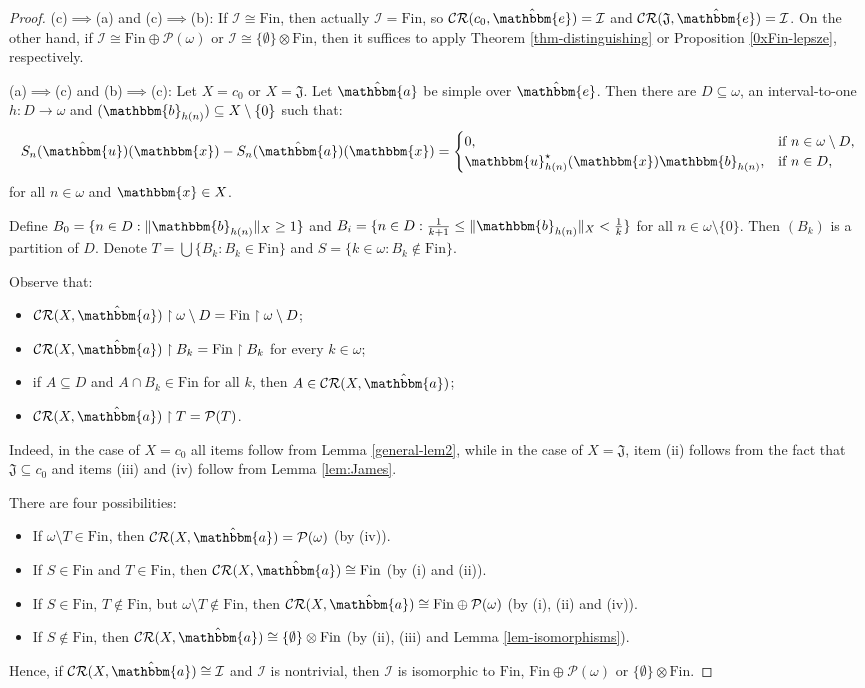 \documentclass{amsart}
\newcommand{\I}{\mathcal{I}}
\newcommand{\Fin}{\mathrm{Fin}}
\newcommand{\CR}{\mathcal{CR}}
\newcommand{\w}{\mathbbm}
\begin{document}
\begin{proof}
(c)$\implies$(a) and (c)$\implies$(b): If $\I\cong\Fin$, then actually $\I=\Fin$, so $\CR(c_0,\hat{\w{e}})=\I$ and $\CR(\mathfrak{J},\hat{\w{e}})=\I$. On the other hand, if $\I\cong \Fin\oplus\mathcal{P}(\omega)$ or $\I\cong\{\emptyset\}\otimes\Fin$, then it suffices to apply Theorem \ref{thm-distinguishing} or Proposition \ref{0xFin-lepsze}, respectively. 

(a)$\implies$(c) and (b)$\implies$(c): Let $X=c_0$ or $X=\mathfrak{J}$. Let $\hat{\w{a}}$ be simple over $\hat{\w{e}}$. Then there are $D\subseteq\omega$, an interval-to-one $h:D\to\omega$ and $(\w{b}_{h(n)})\subseteq X\setminus\{0\}$ such that:
\[
S_n(\hat{\w{u}})(\w{x})-S_n(\hat{\w{a}})(\w{x})=
\begin{cases}
    0, & \text{if }n\in\omega\setminus D,\\
    \w{u}_{h(n)}^\star(\w{x})\w{b}_{h(n)}, & \text{if }n\in D,
\end{cases}
\]
for all $n\in \omega$ and $\w{x}\in X$.

Define $B_0=\{n\in D: \|\w{b}_{h(n)}\|_{X}\geq 1\}$ and $B_i=\{n\in D: \frac{1}{k+1}\leq\|\w{b}_{h(n)}\|_{X}<\frac{1}{k}\}$ for all $n\in\omega\setminus\{0\}$. Then $(B_k)$ is a partition of $D$. Denote $T=\bigcup\{B_k: B_k\in\Fin\}$ and $S=\{k\in\omega: B_k\notin\Fin\}$.

Observe that:
\begin{itemize}
    \item[(i)] $\CR(X,\hat{\w{a}})\restriction \omega\setminus D=\Fin\restriction \omega\setminus D$;
    \item[(ii)] $\CR(X,\hat{\w{a}})\restriction B_k=\Fin\restriction B_k$ for every $k\in\omega$;
    \item[(iii)] if $A\subseteq D$ and $A\cap B_k\in\Fin$ for all $k$, then $A\in \CR(X,\hat{\w{a}})$;
    \item[(iv)] $\CR(X,\hat{\w{a}})\restriction T=\mathcal{P}(T)$.
\end{itemize} 
Indeed, in the case of $X=c_0$ all items follow from Lemma \ref{general-lem2}, while in the case of $X=\mathfrak{J}$, item (ii) follows from the fact that $\mathfrak{J}\subseteq c_0$ and items (iii) and (iv) follow from Lemma \ref{lem:James}.

There are four possibilities:
\begin{itemize}
    \item If $\omega\setminus T\in\Fin$, then $\CR(X,\hat{\w{a}})=\mathcal{P}(\omega)$ (by (iv)).
    \item If $S\in\Fin$ and $T\in\Fin$, then $\CR(X,\hat{\w{a}})\cong\Fin$ (by (i) and (ii)).
    \item If $S\in\Fin$, $T\notin\Fin$, but $\omega\setminus T\notin\Fin$, then $\CR(X,\hat{\w{a}})\cong\Fin\oplus\mathcal{P}(\omega)$ (by (i), (ii) and (iv)).
    \item If $S\notin\Fin$, then $\CR(X,\hat{\w{a}})\cong\{\emptyset\}\otimes\Fin$ (by (ii), (iii) and Lemma \ref{lem-isomorphisms}).
\end{itemize} 
Hence, if $\CR(X,\hat{\w{a}})\cong\I$ and $\I$ is nontrivial, then $\I$ is isomorphic to $\Fin$, $\Fin\oplus\mathcal{P}(\omega)$ or $\{\emptyset\}\otimes\Fin$.
\end{proof}
\end{document}
